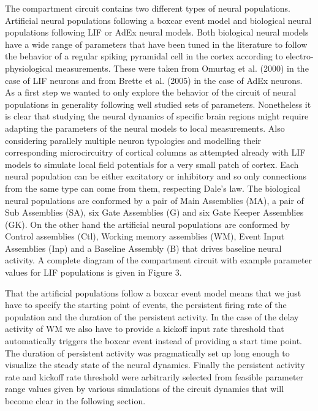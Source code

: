 \documentclass[10pt]{article}
\begin{document}
The compartment circuit contains two different types of neural
populations. Artificial neural populations following a boxcar event
model and biological neural populations following LIF or AdEx neural
models. Both biological neural models have a wide range of parameters
that have been tuned in the literature to follow the behavior of a
regular spiking pyramidal cell in the cortex according to
electro-physiological measurements. These were taken from Omurtag et al.
(2000) \cite{omurtag2000simulation} in the case of LIF neurons and from Brette et
al. (2005) \cite{Brette_2005} in the case of AdEx neurons. As a first
step we wanted to only explore the behavior of the circuit of neural
populations in generality following well studied sets of parameters.
Nonetheless it is clear that studying the neural dynamics of specific
brain regions might require adapting the parameters of the neural models
to local measurements. Also considering parallely multiple neuron
typologies and modelling their corresponding microcircuitry of cortical
columns as attempted already with LIF models to simulate local field
potentials for a very small patch of cortex\cite{Mazzoni_2015,Hagen_2015}. Each
neural population can be either excitatory or inhibitory and so only
connections from the same type can come from them, respecting Dale's
law. The biological neural populations are conformed by a pair of Main
Assemblies (MA), a pair of Sub Assemblies (SA), six Gate Assemblies (G)
and six Gate Keeper Assemblies (GK). On the other hand the artificial
neural populations are conformed by Control assemblies (Ctl), Working
memory assemblies (WM), Event Input Assemblies (Inp) and a Baseline
Assembly (B) that drives baseline neural activity. A complete diagram of
the compartment circuit with example parameter values for LIF
populations is given in Figure 3.

That the artificial populations follow a boxcar event model means that
we just have to specify the starting point of events, the persistent
firing rate of the population and the duration of the persistent
activity. In the case of the delay activity of WM we also have to
provide a kickoff input rate threshold that automatically triggers the
boxcar event instead of providing a start time point. The duration of
persistent activity was pragmatically set up long enough to visualize
the steady state of the neural dynamics. Finally the persistent activity
rate and kickoff rate threshold were arbitrarily selected from feasible
parameter range values given by various simulations of the circuit
dynamics that will become clear in the following section.
\end{document}
